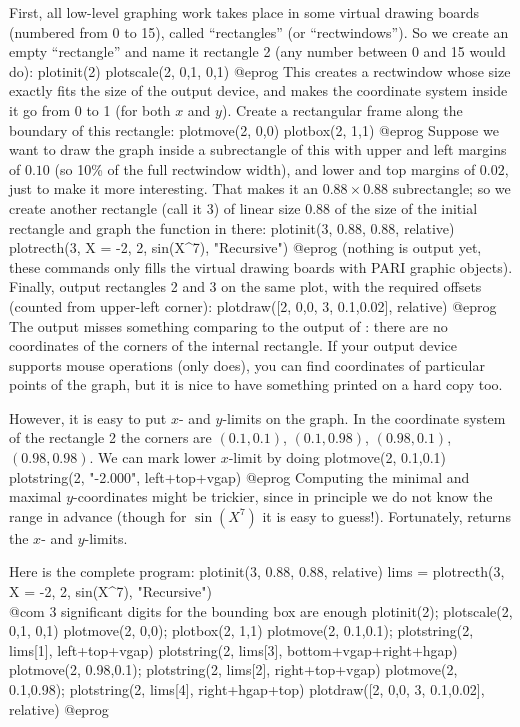 First, all low-level graphing work takes place in some virtual drawing
boards (numbered from 0 to 15), called ``rectangles'' (or ``rectwindows'').
So we create an empty ``rectangle'' and name it rectangle 2 (any
number between 0 and 15 would do):
\bprog
  plotinit(2)
  plotscale(2, 0,1, 0,1)
@eprog
This creates a rectwindow whose size exactly fits the size of the output
device, and makes the coordinate system inside it go from 0 to 1 (for both
$x$ and $y$). Create a rectangular frame along the boundary of this rectangle:
\bprog
  plotmove(2, 0,0)
  plotbox(2, 1,1)
@eprog
Suppose we want to draw the graph inside a subrectangle of this with upper
and left margins of $0.10$ (so 10\% of the full rectwindow width), and
lower and top margins of $0.02$, just to make it more interesting. That
makes it an $0.88 \times 0.88$ subrectangle; so we create another rectangle
(call it 3) of linear size 0.88 of the size of the initial rectangle and
graph the function in there:
\bprog
  plotinit(3, 0.88, 0.88, relative)
  plotrecth(3, X = -2, 2, sin(X^7), "Recursive")
@eprog
(nothing is output yet, these commands only fills the virtual drawing
boards with PARI graphic objects). Finally, output rectangles 2 and 3 on
the same plot, with the required offsets (counted from upper-left corner):
\bprog
  plotdraw([2, 0,0,  3, 0.1,0.02], relative)
@eprog
\noindent The output misses something comparing to the output of
: there are no coordinates of the corners of the internal
rectangle.  If your output device supports mouse operations (only
 does), you can find coordinates of particular points of the
graph, but it is nice to have something printed on a hard copy too.

However, it is easy to put $x$- and $y$-limits on the graph.  In the
coordinate system of the rectangle 2 the corners are $(0.1,0.1)$,
$(0.1,0.98)$, $(0.98,0.1)$, $(0.98,0.98)$.  We can mark lower $x$-limit by
doing
\bprog
  plotmove(2, 0.1,0.1)
  plotstring(2, "-2.000", left+top+vgap)
@eprog\noindent
Computing the minimal and maximal $y$-coordinates might be trickier, since
in principle we do not know the range in advance (though for $\sin(X^7)$ it
is easy to guess!). Fortunately,  returns the $x$- and
$y$-limits.

Here is the complete program:
\bprog
  plotinit(3, 0.88, 0.88, relative)
  lims = plotrecth(3, X = -2, 2, sin(X^7), "Recursive")
            \\ @com $3$ significant digits for the bounding box are enough
  plotinit(2);      plotscale(2, 0,1, 0,1)
  plotmove(2, 0,0); plotbox(2, 1,1)
  plotmove(2, 0.1,0.1);
  plotstring(2, lims[1], left+top+vgap)
  plotstring(2, lims[3], bottom+vgap+right+hgap)
  plotmove(2, 0.98,0.1); plotstring(2, lims[2], right+top+vgap)
  plotmove(2, 0.1,0.98); plotstring(2, lims[4], right+hgap+top)
  plotdraw([2, 0,0,  3, 0.1,0.02], relative)
@eprog

